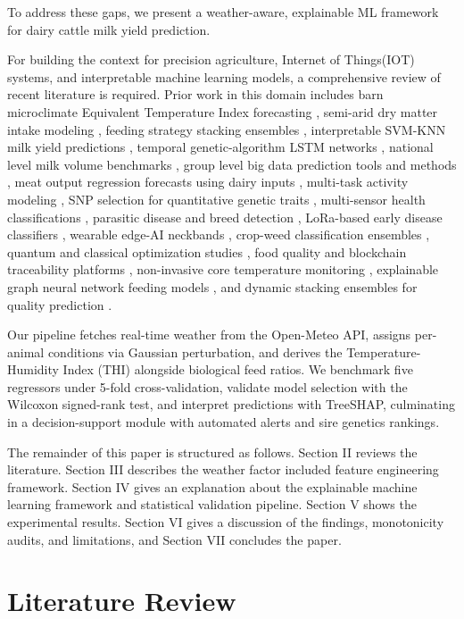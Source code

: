 \documentclass[conference]{IEEEtran}
\begin{document}
	To address these gaps, we present a weather-aware, explainable ML framework for dairy cattle milk yield prediction.
	
	For building the context for precision agriculture, Internet of Things(IOT) systems, and interpretable machine learning models, a comprehensive review of recent literature is required. Prior work in this domain includes barn microclimate Equivalent Temperature Index forecasting \cite{ref1}, semi-arid dry matter intake modeling \cite{ref2}, feeding strategy stacking ensembles \cite{ref3}, interpretable SVM-KNN milk yield predictions \cite{ref4}, temporal genetic-algorithm LSTM networks \cite{ref5}, national level milk volume benchmarks \cite{ref6}, group level big data prediction tools and methods \cite{ref7}, meat output regression forecasts using dairy inputs \cite{ref8}, multi-task activity modeling \cite{ref9}, SNP selection for quantitative genetic traits \cite{ref10}, multi-sensor health classifications \cite{ref11}, parasitic disease and breed detection \cite{ref12}, LoRa-based early disease classifiers \cite{ref13}, wearable edge-AI neckbands \cite{ref14}, crop-weed classification ensembles \cite{ref15}, quantum and classical optimization studies \cite{ref16}, food quality and blockchain traceability platforms \cite{ref17}, non-invasive core temperature monitoring \cite{ref18}, explainable graph neural network feeding models \cite{ref19}, and dynamic stacking ensembles for quality prediction \cite{ref20}.
	
	Our pipeline fetches real-time weather from the Open-Meteo API, assigns per-animal conditions via Gaussian perturbation, and derives the Temperature-Humidity Index (THI) alongside biological feed ratios. We benchmark five regressors under 5-fold cross-validation, validate model selection with the Wilcoxon signed-rank test, and interpret predictions with TreeSHAP, culminating in a decision-support module with automated alerts and sire genetics rankings.
	
	The remainder of this paper is structured as follows. Section II reviews the literature. Section III describes the weather factor included feature engineering framework. Section IV gives an explanation about the explainable machine learning framework and statistical validation pipeline. Section V shows the experimental results. Section VI gives a discussion of the findings, monotonicity audits, and limitations, and Section VII concludes the paper.
	
	\section{Literature Review}
	
\end{document}
